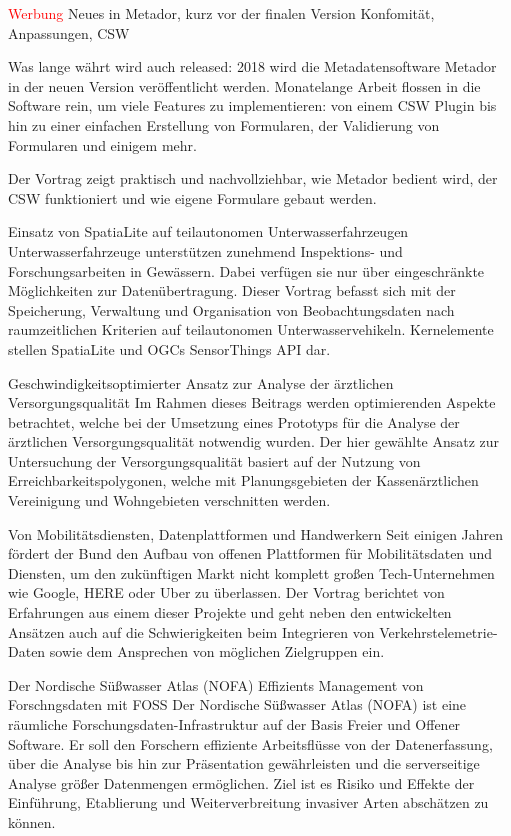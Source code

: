 \renewcommand{\conferenceDay}{\freitag}
\textcolor{red}{Werbung}
\newpage
{}
%
{Neues in Metador, kurz vor der finalen Version}%
{Konfomität, Anpassungen, CSW}%
{%
Was lange währt wird auch released: 2018 wird die Metadatensoftware Metador
in der neuen Version veröffentlicht werden. Monatelange Arbeit flossen in
die Software rein, um viele Features zu implementieren: von einem CSW Plugin
bis hin zu einer einfachen Erstellung von Formularen, der Validierung von
Formularen und einigem mehr.

Der Vortrag zeigt praktisch und nachvollziehbar, wie Metador bedient wird,
der CSW funktioniert und wie eigene Formulare gebaut werden.%
}

%
{Einsatz von SpatiaLite auf teilautonomen Unterwasserfahrzeugen}%
{}%
{%
Unterwasserfahrzeuge unterstützen zunehmend Inspektions- und Forschungsarbeiten in Gewässern. Dabei verfügen sie nur über eingeschränkte Möglichkeiten zur Datenübertragung. Dieser Vortrag befasst sich mit der Speicherung, Verwaltung und Organisation von Beobachtungsdaten nach raumzeitlichen Kriterien auf teilautonomen Unterwasservehikeln. Kernelemente stellen SpatiaLite und OGCs SensorThings API dar.%
}

%
{Geschwindigkeitsoptimierter Ansatz zur Analyse der ärztlichen Versorgungsqualität}%
{}%
{%
Im Rahmen dieses Beitrags werden optimierenden Aspekte betrachtet, welche bei der Umsetzung eines Prototyps für die Analyse der ärztlichen Versorgungsqualität notwendig wurden. Der hier gewählte Ansatz zur Untersuchung der Versorgungsqualität basiert auf der Nutzung von Erreichbarkeitspolygonen, welche mit Planungsgebieten der Kassenärztlichen Vereinigung und Wohngebieten verschnitten werden.%
}

%
{Von Mobilitätsdiensten, Datenplattformen und Handwerkern}%
{}%
{%
Seit einigen Jahren fördert der Bund den Aufbau von offenen Plattformen für Mobilitätsdaten und Diensten, um den zukünftigen Markt nicht komplett großen Tech-Unternehmen wie Google, HERE oder Uber zu überlassen. Der Vortrag berichtet von Erfahrungen aus einem dieser Projekte und geht neben den entwickelten Ansätzen auch auf die Schwierigkeiten beim Integrieren von Verkehrstelemetrie-Daten sowie dem Ansprechen von möglichen Zielgruppen ein.%
}

%
{Der Nordische Süßwasser Atlas (NOFA)}%
{Effizients Management von Forschngsdaten mit FOSS}%
{%
Der Nordische Süßwasser Atlas (NOFA) ist eine räumliche Forschungsdaten-Infrastruktur auf der Basis Freier und Offener Software. Er soll den Forschern effiziente Arbeitsflüsse von der Datenerfassung, über die Analyse bis hin zur Präsentation gewährleisten und die serverseitige Analyse größer Datenmengen ermöglichen. Ziel ist es Risiko und Effekte der Einführung, Etablierung und Weiterverbreitung invasiver Arten abschätzen zu können.%
}

